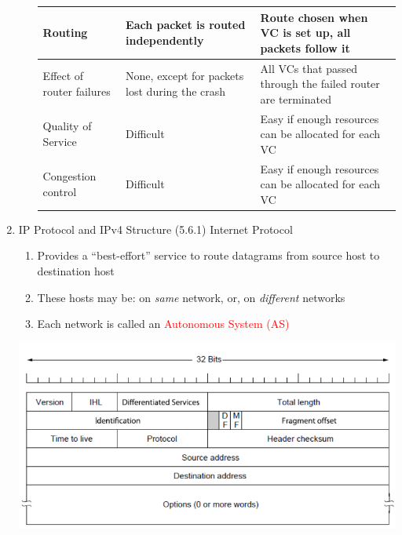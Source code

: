 \documentclass[a4paper,10pt]{article}
\newcommand{\red}[1]{\textcolor{red}{#1}}
\begin{document}
\begin{enumerate}
\begin{enumerate}
\begin{table}[h]
\begin{tabularx}{\textwidth}{l | X | X}
        Routing & Each packet is routed independently & Route chosen when VC is set up, all packets follow it \\ \hline
        Effect of router failures & None, except for packets lost during the crash & All VCs that passed through the failed router are terminated \\ \hline
        Quality of Service & Difficult & Easy if enough resources can be allocated for each VC \\ \hline
        Congestion control & Difficult & Easy if enough resources can be allocated for each VC
      \end{tabularx}\end{table}
    \end{enumerate}
  
  \item IP Protocol and IPv4 Structure (5.6.1)
    \newline Internet Protocol
    \begin{enumerate}
      \item Provides a ``best-effort'' service to route datagrams from source host to destination host
      \item These hosts may be: on \textit{same} network, or, on \textit{different} networks
      \item Each network is called an \red{Autonomous System (AS)}
    \end{enumerate}
    \includegraphics[width=\textwidth]{ip}
  

\end{enumerate}
\end{document}
